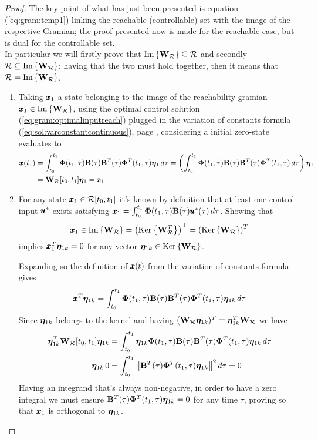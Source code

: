 	\begin{proof} \label{pr:gram:temp1}
		The key point of what has just been presented is equation (\ref{eq:gram:temp1}) linking the reachable (controllable) set with the image of the respective Gramian; the proof presented now is made for the reachable case, but is dual for the controllable set.\\
		In particular we will firstly prove that $\textrm{Im}\left\{\mathbf{W}_\mathcal R\right\} \subseteq \mathcal R$ and secondly $\mathcal R \subseteq \textrm{Im}\left\{\mathbf{W}_\mathcal R\right\}$: having that the two must hold together, then it means that $\mathcal R = \textrm{Im}\left\{\mathbf{W}_\mathcal R\right\}$.
		\begin{enumerate}[\itshape a)]
			\item Taking $\pmb{x}_1$ a state belonging to the image of the reachability gramian $\pmb{x}_1 \in \textrm{Im}\left\{\mathbf{W}_\mathcal R\right\}$, using the optimal control solution (\ref{eq:gram:optimalinputreach}) plugged in the variation of constants formula (\ref{eq:sol:varconstantcontinuous}), page \pageref{eq:sol:varconstantcontinuous}, considering a initial zero-state evaluates to
			\begin{align*}
				\pmb{x}(t_1) & = \int_{t_0}^{t_1} \mathbf{\Phi}(t_1,\tau) \mathbf{B}(\tau) \mathbf{B}^T(\tau) \mathbf{\Phi}^T(t_1,\tau)\boldsymbol{\eta}_1 \, d\tau = \left(\int_{t_0}^{t_1} \mathbf{\Phi}(t_1,\tau) \mathbf{B}(\tau) \mathbf{B}^T(\tau) \mathbf{\Phi}^T(t_1,\tau) \, d\tau \right) \boldsymbol{\eta}_1 \\
				& = \mathbf{W}_\mathcal R[t_0,t_1] \boldsymbol{\eta}_1 = \pmb{x}_1
			\end{align*}
		
			\item For any state $\pmb{x}_1 \in \mathcal R[t_0,t_1]$ it's known by definition that at least one control input $\pmb{u}^*$ exists satisfying $\pmb{x}_1 = \int_{t_0}^{t_1} \mathbf{\Phi}(t_1,\tau) \mathbf{B}(\tau) \pmb{u}^*(\tau) \, d\tau$. Showing that
			\[ \pmb{x}_1 \in \textrm{Im}\left\{\mathbf{W}_\mathcal R\right\} = \left(\textrm{Ker}\left\{\mathbf{W}_\mathcal R^T\right\}\right)^\perp = \left(\textrm{Ker}\left\{\mathbf{W}_\mathcal R\right\}\right)^T \]
			implies $\pmb{x}_1^T \boldsymbol{\eta}_{1k} = 0$ for any vector $\boldsymbol{\eta}_{1k}\in \textrm{Ker}\left\{\mathbf{W}_\mathcal R\right\}$.
			
			Expanding so the definition of $\pmb{x}(t)$ from the variation of constants formula gives
			\[ \pmb{x}^T \boldsymbol{\eta}_{1k} = \int_{t_0}^{t_1} \mathbf{\Phi}(t_1,\tau) \mathbf{B}(\tau) \mathbf{B}^T(\tau) \mathbf{\Phi}^T(t_1,\tau)\boldsymbol{\eta}_{1k} \, d\tau \]
			Since $\boldsymbol{\eta}_{1k}$ belongs to the kernel and having $\big(\mathbf{W}_\mathcal R \boldsymbol{\eta}_{1k})^T = \boldsymbol{\eta}_{1k}^T \mathbf{W}_\mathcal R$ we have
			\begin{align*}
				\boldsymbol{\eta}_{1k}^T \mathbf{W}_\mathcal R[t_0,t_1] \boldsymbol{\eta}_{1k} & = \int_{t_0}^{t_1} \boldsymbol{\eta}_{1k} \mathbf{\Phi}(t_1,\tau) \mathbf{B}(\tau) \mathbf{B}^T(\tau) \mathbf{\Phi}^T(t_1,\tau)\boldsymbol{\eta}_{1k} \, d\tau \\
				\boldsymbol{\eta}_{1k} \, 0 & = \int_{t_0}^{t_1} \big\| \mathbf{B}^T(\tau) \mathbf{\Phi}^T(t_1,\tau) \boldsymbol{\eta}_{1k} \big\|^2 \, d\tau = 0 
			\end{align*}
			Having an integrand that's always non-negative, in order to have a zero integral we must ensure $\mathbf{B}^T(\tau) \mathbf{\Phi}^T(t_1,\tau) \boldsymbol{\eta}_{1k} = 0$ for any time $\tau$, proving so that $\pmb{x}_1$ is orthogonal to $\boldsymbol{\eta}_{1k}$.
			
		\end{enumerate}		
	\end{proof}
